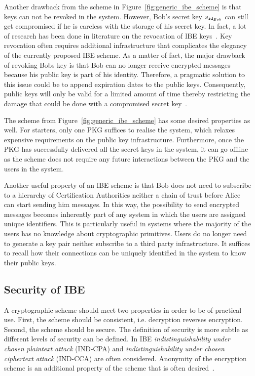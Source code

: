 Another drawback from the scheme in Figure~\ref{fig:generic_ibe_scheme} is that keys can not be revoked in the system. However, Bob's secret key $s_{\mathtt{id}_{Bob}}$ can still get compromised if he is careless with the storage of his secret key. In fact, a lot of research has been done in literature on the revocation of IBE keys~\cite{art:BoldyrevaGK12,art:BonehDTW01,art:HanaokaHSI05,art:LibertQ03}. Key revocation often requires additional infrastructure that complicates the elegancy of the currently proposed IBE scheme. As a matter of fact, the major drawback of revoking Bobs key is that Bob can no longer receive encrypted messages because his public key is part of his identity. Therefore, a pragmatic solution to this issue could be to append expiration dates to the public keys. Consequently, public keys will only be valid for a limited amount of time thereby restricting the damage that could be done with a compromised secret key~\cite{art:BonehF01}.

The scheme from Figure~\ref{fig:generic_ibe_scheme} has some desired properties as well. For starters, only one PKG suffices to realise the system, which relaxes expensive requirements on the public key infrastructure. Furthermore, once the PKG has successfully delivered all the secret keys in the system, it can go offline as the scheme does not require any future interactions between the PKG and the users in the system.

Another useful property of an IBE scheme is that Bob does not need to subscribe to a hierarchy of Certification Authorities neither a chain of trust before Alice can start sending him messages. In this way, the possibility to send encrypted messages becomes inherently part of any system in which the users are assigned unique identifiers. This is particularly useful in systems where the majority of the users has no knowledge about cryptographic primitives.  Users do no longer need to generate a key pair neither subscribe to a third party infrastructure. It suffices to recall how their connections can be uniquely identified in the system to know their public keys.

\subsection{Security of IBE}
A cryptographic scheme should meet two properties in order to be of practical use. First, the scheme should be consistent, i.e. decryption reverses encryption. Second, the scheme should be secure. The definition of security is more subtle as different levels of security can be defined. In IBE \textit{indistinguishability under chosen plaintext attack} (IND-CPA) and \textit{indistinguishability under chosen ciphertext attack} (IND-CCA) are often considered. Anonymity of the encryption scheme is an additional property of the scheme that is often desired~\cite{thesis:Alfredo08}.

